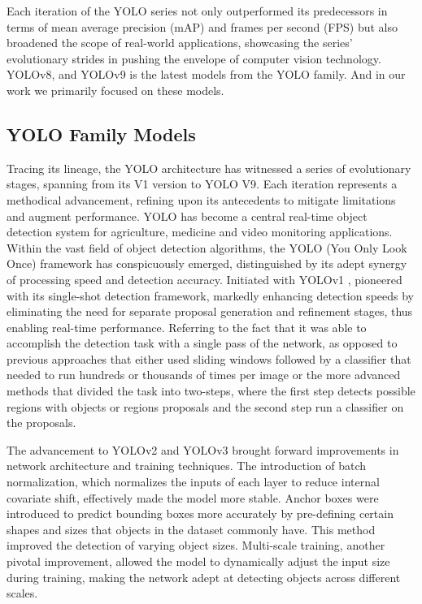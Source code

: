 Each iteration of the YOLO series not only outperformed its predecessors in terms of mean average precision (mAP) and frames per second (FPS) but also broadened the scope of real-world applications, showcasing the series' evolutionary strides in pushing the envelope of computer vision technology. YOLOv8, and YOLOv9 is the latest models from the YOLO family. And in our work we primarily focused on these models.




\subsection{YOLO Family Models}



Tracing its lineage, the YOLO architecture has witnessed a series of evolutionary stages, spanning from its V1 version to YOLO V9. Each iteration represents a methodical advancement, refining upon its antecedents to mitigate limitations and augment performance. 
YOLO has become a central real-time object detection system for agriculture, medicine and video monitoring applications. Within the vast field of object detection algorithms, the YOLO (You Only Look Once) framework has conspicuously emerged, distinguished by its adept synergy of processing speed and detection accuracy. Initiated with YOLOv1 \cite{redmon2016you}, pioneered with its single-shot detection framework, markedly enhancing detection speeds by eliminating the need for separate proposal generation and refinement stages, thus enabling real-time performance. Referring to the fact that it was able to accomplish the detection task with a single pass of the network, as opposed to previous approaches that either used sliding windows followed by a classifier that needed to run hundreds or thousands of times per image or the more advanced methods that divided the task into two-steps, where the first step detects possible regions with objects or regions proposals and the second step run a classifier on the proposals.


The advancement to YOLOv2 \cite{redmon2017yolo9000} and YOLOv3 \cite{redmon2018yolov3} brought forward improvements in network architecture and training techniques. The introduction of batch normalization, which normalizes the inputs of each layer to reduce internal covariate shift, effectively made the model more stable. Anchor boxes were introduced to predict bounding boxes more accurately by pre-defining certain shapes and sizes that objects in the dataset commonly have. This method improved the detection of varying object sizes. Multi-scale training, another pivotal improvement, allowed the model to dynamically adjust the input size during training, making the network adept at detecting objects across different scales.

